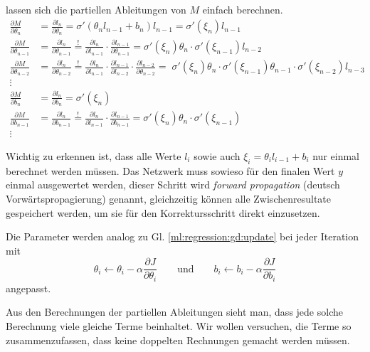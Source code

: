 lassen sich die partiellen Ableitungen von $M$ einfach berechnen.
\[
\begin{aligned}
    \frac{\partial M}{\partial \theta_n} &= \frac{\partial l_n}{\partial \theta_n} =
    \sigma'(\theta_n l_{n-1} + b_n) l_{n-1} = \sigma'(\xi_n)l_{n-1} \\
    \frac{\partial M}{\partial \theta_{n-1}} &= \frac{\partial l_{n}}{\partial \theta_{n-1}}
    \stackrel{!}{=} \frac{\partial l_n}{\partial l_{n-1}} \cdot \frac{\partial
    l_{n-1}}{\partial \theta_{n-1}} = 
    \sigma'(\xi_n) \theta_n \cdot \sigma'(\xi_{n-1}) l_{n-2}
    \\
    \frac{\partial M}{\partial \theta_{n-2}} &= \frac{\partial l_{n}}{\partial \theta_{n-2}}
    \stackrel{!}{=} \frac{\partial l_n}{\partial l_{n-1}} \cdot \frac{\partial
    l_{n-1}}{\partial l_{n-2}}\cdot \frac{\partial l_{n-2}}{\partial \theta_{n-2}} =
    \; \sigma'(\xi_n)\theta_n \cdot \sigma'(\xi_{n-1})\theta_{n-1}\cdot \sigma'(\xi_{n-2})l_{n-3}
    \\
    \vdots\quad&\\
    \frac{\partial M}{\partial b_n} &= \frac{\partial l_n}{\partial b_n} =
    \sigma'(\xi_n) \\
    \frac{\partial M}{\partial b_{n-1}} &= \frac{\partial l_{n}}{\partial b_{n-1}}
    \stackrel{!}{=} \frac{\partial l_n}{\partial l_{n-1}} \cdot \frac{\partial
    l_{n-1}}{\partial b_{n-1}} = 
    \sigma'(\xi_n) \theta_n \cdot \sigma'(\xi_{n-1}) \\
    \vdots\quad&
\end{aligned}
\]

Wichtig zu erkennen ist, dass alle Werte $l_i$ sowie auch $\xi_i=\theta_i l_{i-1}+b_i$ nur
einmal berechnet werden müssen. Das Netzwerk muss sowieso für den finalen Wert $y$ einmal
ausgewertet werden, dieser Schritt wird \emph{forward propagation} (deutsch Vorwärtspropagierung)
genannt, gleichzeitig können alle Zwischenresultate gespeichert werden, um sie für den
Korrektursschritt direkt einzusetzen.

Die Parameter werden analog zu Gl. \ref{ml:regression:gd:update} bei jeder Iteration mit
\begin{equation}
    \theta_i \leftarrow \theta_i - \alpha \frac{\partial J}{\partial \theta_i}
    \qquad\text{und}\qquad
    b_i \leftarrow b_i - \alpha \frac{\partial J}{\partial b_i}
\end{equation}
angepasst.

Aus den Berechnungen der partiellen Ableitungen sieht man, dass jede solche
Berechnung viele gleiche Terme beinhaltet. Wir wollen versuchen, die Terme so
zusammenzufassen, dass keine doppelten Rechnungen gemacht werden müssen.

